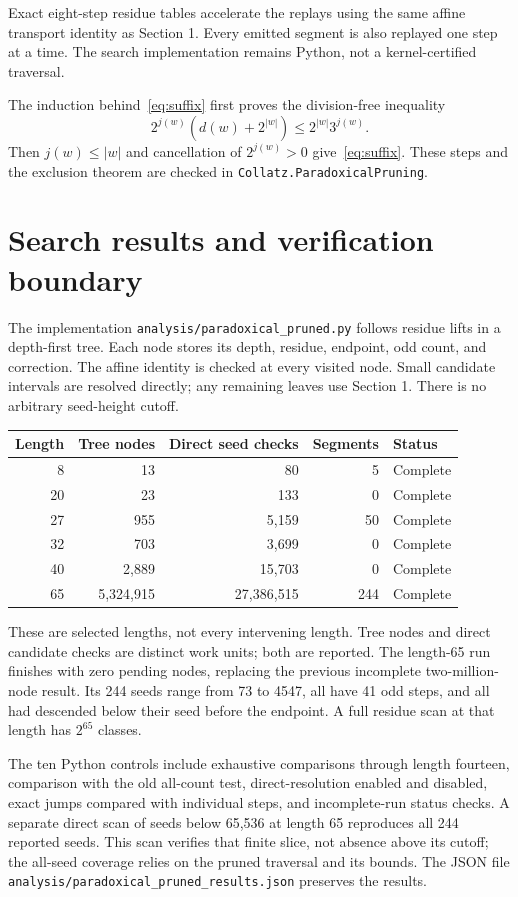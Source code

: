 \documentclass[11pt]{article}
\begin{document}
Exact eight-step residue tables accelerate the replays using the same
affine transport identity as Section 1. Every emitted segment is also
replayed one step at a time. The search implementation remains Python,
not a kernel-certified traversal.

The induction behind~\eqref{eq:suffix} first proves the division-free inequality
\[
2^{j(w)}(d(w)+2^{|w|})\le2^{|w|}3^{j(w)}.
\]
Then $j(w)\le|w|$ and cancellation of $2^{j(w)}>0$ give~\eqref{eq:suffix}. These steps and the exclusion theorem are checked in \texttt{Collatz.ParadoxicalPruning}.

\section{Search results and verification boundary}
The implementation \texttt{analysis/paradoxical\_pruned.py} follows residue lifts in a depth-first tree. Each node stores its depth, residue, endpoint, odd count, and correction. The affine identity is checked at every visited node. Small candidate intervals are resolved directly; any remaining leaves use Section 1. There is no arbitrary seed-height cutoff.
\begin{center}\small
\begin{tabular}{rrrrl}
\toprule
Length&Tree nodes&Direct seed checks&Segments&Status\\
\midrule
8&13&80&5&Complete\\
20&23&133&0&Complete\\
27&955&5,159&50&Complete\\
32&703&3,699&0&Complete\\
40&2,889&15,703&0&Complete\\
65&5,324,915&27,386,515&244&Complete\\
\bottomrule
\end{tabular}
\end{center}
These are selected lengths, not every intervening length. Tree nodes
and direct candidate checks are distinct work units; both are reported.
The length-65 run finishes with zero pending nodes, replacing the previous
incomplete two-million-node result. Its 244 seeds range from 73 to 4547,
all have 41 odd steps, and all had descended below their seed before the
endpoint. A full residue scan at that length has $2^{65}$ classes.

The ten Python controls include exhaustive comparisons through length
fourteen, comparison with the old all-count test, direct-resolution enabled
and disabled, exact jumps compared with individual steps, and incomplete-run
status checks. A separate direct scan of seeds below 65,536 at length 65
reproduces all 244 reported seeds. This scan verifies that finite slice,
not absence above its cutoff; the all-seed coverage relies on the pruned
traversal and its bounds. The JSON file
\texttt{analysis/paradoxical\_pruned\_results.json} preserves the results.
\end{document}
